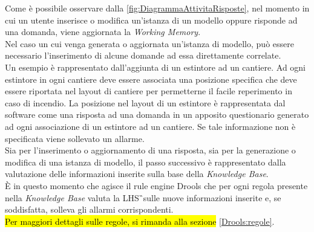 Come è possibile osservare dalla \autoref{fig:DiagrammaAttivitaRisposte}, nel momento in cui un utente inserisce o modifica un'istanza di un modello oppure risponde ad una domanda, viene aggiornata la \textit{Working Memory}. \\
Nel caso un cui venga generata o aggiornata un'istanza di modello, può essere necessario l'inserimento di alcune domande ad essa direttamente correlate.\\
Un esempio è rappresentato dall'aggiunta di un estintore ad un cantiere. Ad ogni estintore in ogni cantiere deve essere associata una posizione specifica che deve essere riportata nel layout di cantiere per permetterne il facile reperimento in caso di incendio. La posizione nel layout di un estintore è rappresentata dal software come una risposta ad una domanda in un apposito questionario generato ad ogni associazione di un estintore ad un cantiere. Se tale informazione non è specificata viene sollevato un allarme.\\
Sia per l'inserimento o aggiornamento di una risposta, sia per la generazione o modifica di una istanza di modello, il passo successivo è rappresentato dalla valutazione delle informazioni inserite sulla base della \textit{Knowledge Base}. \\
È in questo momento che agisce il rule engine Drools che per ogni regola presente nella \textit{Knowledge Base} valuta la \gls{LHS}\G\ sulle nuove informazioni inserite e, se soddisfatta, solleva gli allarmi corrispondenti. \\
\hl{Per maggiori dettagli sulle regole, si rimanda alla sezione} \ref{Drools:regole}.



















